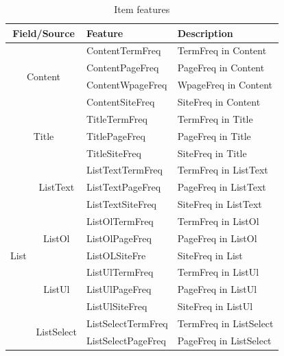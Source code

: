\begin{table}[h!]
\centering
\caption{Item features}
\label{tab:facet-tfeature}
\begin{tabular}{|c|c|l|l|}
\hline
\multicolumn{2}{|c|}{\textbf{Field/Source}}                &  \textbf{Feature} & \textbf{Description}\\ \hline
\multicolumn{2}{|c|}{\multirow{4}{*}{Content}}   & ContentTermFreq & TermFreq in Content\\ 
\multicolumn{2}{|l|}{}                    &  ContentPageFreq & PageFreq in Content \\  
\multicolumn{2}{|l|}{}                    &  ContentWpageFreq & WpageFreq in Content \\  
\multicolumn{2}{|l|}{}                    &  ContentSiteFreq & SiteFreq in Content \\ \hline  
\multicolumn{2}{|c|}{\multirow{3}{*}{Title}}   & TitleTermFreq & TermFreq in Title  \\ 
\multicolumn{2}{|l|}{}                    &  TitlePageFreq & PageFreq in Title \\  
\multicolumn{2}{|l|}{}                    &  TitleSiteFreq & SiteFreq in Title \\  \hline
		   \multirow{18}{*}{List} & \multirow{3}{*}{ListText} & ListTextTermFreq & TermFreq in ListText \\ 
						 &                   &  ListTextPageFreq & PageFreq in ListText \\ 
					         &                   &  ListTextSiteFreq & SiteFreq in ListText \\ \cline{2-4} 
                  & \multirow{3}{*}{ListOl} & ListOlTermFreq & TermFreq in ListOl \\ 
                  &                   &  ListOlPageFreq      & PageFreq in ListOl\\ 
                  &                   &  ListOLSiteFre       & SiteFreq in List\\ \cline{2-4} 
                  & \multirow{3}{*}{ListUl} & ListUlTermFreq  & TermFreq in ListUl \\ 
                  &                   &  ListUlPageFreq       & PageFreq in ListUl \\ 
                  &                   &  ListUlSiteFreq       & SiteFreq in ListUl \\ \cline{2-4} 
                  & \multirow{3}{*}{ListSelect} & ListSelectTermFreq  & TermFreq in ListSelect \\ 
                  &                   &  ListSelectPageFreq           & PageFreq in ListSelect \\ 

\end{tabular}
\end{table}
